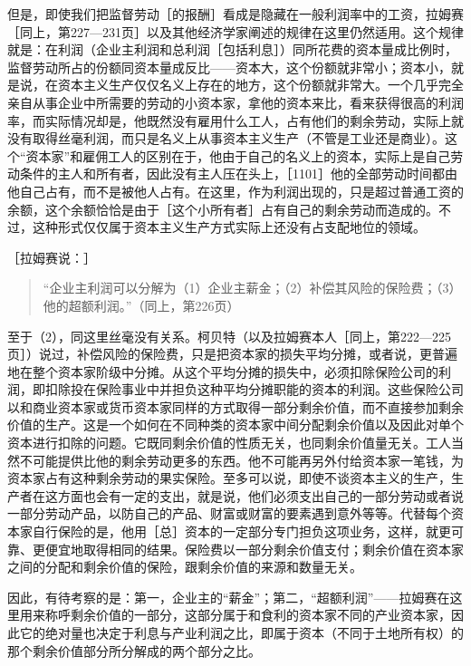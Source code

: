 但是，即使我们把监督劳动［的报酬］看成是隐藏在一般利润率中的工资，拉姆赛［同上，第227—231页］以及其他经济学家阐述的规律在这里仍然适用。这个规律就是：在利润（企业主利润和总利润［包括利息］）同所花费的资本量成比例时，监督劳动所占的份额同资本量成反比——资本大，这个份额就非常小；资本小，就是说，在资本主义生产仅仅名义上存在的地方，这个份额就非常大。一个几乎完全亲自从事企业中所需要的劳动的小资本家，拿他的资本来比，看来获得很高的利润率，而实际情况却是，他既然没有雇用什么工人，占有他们的剩余劳动，实际上就没有取得丝毫利润，而只是名义上从事资本主义生产（不管是工业还是商业）。这个“资本家”和雇佣工人的区别在于，他由于自己的名义上的资本，实际上是自己劳动条件的主人和所有者，因此没有主人压在头上，［1101］他的全部劳动时间都由他自己占有，而不是被他人占有。在这里，作为利润出现的，只是超过普通工资的余额，这个余额恰恰是由于［这个小所有者］占有自己的剩余劳动而造成的。不过，这种形式仅仅属于资本主义生产方式实际上还没有占支配地位的领域。

［拉姆赛说：］

\begin{quote}{“企业主利润可以分解为（1）企业主薪金；（2）补偿其风险的保险费；（3）他的超额利润。”（同上，第226页）}\end{quote}

至于（2），同这里丝毫没有关系。柯贝特（以及拉姆赛本人［同上，第222—225页］）说过，补偿风险的保险费，只是把资本家的损失平均分摊，或者说，更普遍地在整个资本家阶级中分摊。从这个平均分摊的损失中，必须扣除保险公司的利润，即扣除投在保险事业中并担负这种平均分摊职能的资本的利润。这些保险公司以和商业资本家或货币资本家同样的方式取得一部分剩余价值，而不直接参加剩余价值的生产。这是一个如何在不同种类的资本家中间分配剩余价值以及因此对单个资本进行扣除的问题。它既同剩余价值的性质无关，也同剩余价值量无关。工人当然不可能提供比他的剩余劳动更多的东西。他不可能再另外付给资本家一笔钱，为资本家占有这种剩余劳动的果实保险。至多可以说，即使不谈资本主义的生产，生产者在这方面也会有一定的支出，就是说，他们必须支出自己的一部分劳动或者说一部分劳动产品，以防自己的产品、财富或财富的要素遇到意外等等。代替每个资本家自行保险的是，他用［总］资本的一定部分专门担负这项业务，这样，就更可靠、更便宜地取得相同的结果。保险费以一部分剩余价值支付；剩余价值在资本家之间的分配和剩余价值的保险，跟剩余价值的来源和数量无关。

因此，有待考察的是：第一，企业主的“薪金”；第二，“超额利润”——拉姆赛在这里用来称呼剩余价值的一部分，这部分属于和食利的资本家不同的产业资本家，因此它的绝对量也决定于利息与产业利润之比，即属于资本（不同于土地所有权）的那个剩余价值部分所分解成的两个部分之比。

